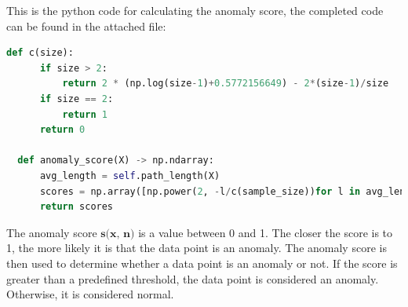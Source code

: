 This is the python code for calculating the anomaly score, the completed code can be found in the attached file:

\begin{lstlisting}[language=Python]
  def c(size):
      if size > 2:
          return 2 * (np.log(size-1)+0.5772156649) - 2*(size-1)/size
      if size == 2:
          return 1
      return 0
  
  def anomaly_score(X) -> np.ndarray:
      avg_length = self.path_length(X)
      scores = np.array([np.power(2, -l/c(sample_size))for l in avg_length])
      return scores
\end{lstlisting}
  

The anomaly score $\textbf{s(x, n)}$ is a value between 0 and 1. The closer the score is to 1, the more likely it is that the data point is an anomaly. The anomaly score is then used to determine whether a data point is an anomaly or not. If the score is greater than a predefined threshold, the data point is considered an anomaly. Otherwise, it is considered normal.

